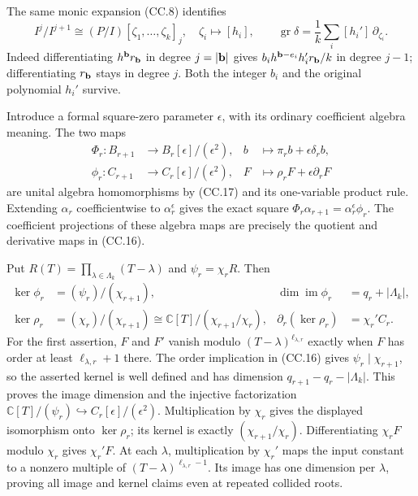 The same monic expansion (CC.8) identifies
\[
 I^j/I^{j+1}\cong
 (P/I)[\zeta_1,\ldots,\zeta_k]_j,\quad
 \zeta_i\longmapsto[h_i],
 \qquad
 \operatorname{gr}\delta
 =\frac1k\sum_i[h_i']\,\partial_{\zeta_i}.
 \tag{CC.18}
\]
Indeed differentiating \(h^{\bf b}r_{\bf b}\) in degree \(j=|{\bf b}|\)
gives \(b_i h^{{\bf b}-e_i}h_i'r_{\bf b}/k\) in degree \(j-1\);
differentiating \(r_{\bf b}\) stays in degree \(j\).
Both the integer \(b_i\) and the original polynomial \(h_i'\) survive.

Introduce a formal square-zero parameter \(\epsilon\), with its
ordinary coefficient algebra meaning.  The two maps
\[
\begin{split}
 \Phi_r:B_{r+1}&\longrightarrow B_r[\epsilon]/(\epsilon^2),
 &b&\longmapsto\pi_rb+\epsilon\delta_rb,\\
 \phi_r:C_{r+1}&\longrightarrow C_r[\epsilon]/(\epsilon^2),
 &F&\longmapsto\rho_rF+\epsilon\partial_rF
\end{split}
\tag{CC.19}
\]
are unital algebra homomorphisms by (CC.17) and its one-variable
product rule.  Extending \(\alpha_r\) coefficientwise to
\(\alpha_r^\epsilon\) gives the exact square
\(\Phi_r\alpha_{r+1}=\alpha_r^\epsilon\phi_r\).
The coefficient projections of these algebra maps are precisely
the quotient and derivative maps in (CC.16).

Put \(R(T)=\prod_{\lambda\in\Lambda_k}(T-\lambda)\) and
\(\psi_r=\chi_rR\).  Then
\[
\begin{split}
 \ker\phi_r&=(\psi_r)/(\chi_{r+1}),&
 \dim\operatorname{im}\phi_r&=q_r+|\Lambda_k|,\\
 \ker\rho_r&=(\chi_r)/(\chi_{r+1})
       \cong\mathbb C[T]/(\chi_{r+1}/\chi_r),&
 \partial_r(\ker\rho_r)&=\chi_r'C_r .
\end{split}
\tag{CC.20}
\]
For the first assertion, \(F\) and \(F'\) vanish modulo
\((T-\lambda)^{\ell_{\lambda,r}}\) exactly when \(F\) has order
at least \(\ell_{\lambda,r}+1\) there.  The order implication in
(CC.16) gives \(\psi_r\mid\chi_{r+1}\), so the asserted kernel is
well defined and has dimension \(q_{r+1}-q_r-|\Lambda_k|\).
This proves the image dimension and the injective factorization
\(\mathbb C[T]/(\psi_r)\hookrightarrow C_r[\epsilon]/(\epsilon^2)\).
Multiplication by \(\chi_r\) gives the displayed isomorphism onto
\(\ker\rho_r\); its kernel is exactly \((\chi_{r+1}/\chi_r)\).
Differentiating \(\chi_rF\) modulo \(\chi_r\) gives \(\chi_r'F\).
At each \(\lambda\), multiplication by \(\chi_r'\) maps the input
constant to a nonzero multiple of
\((T-\lambda)^{\ell_{\lambda,r}-1}\).
Its image has one dimension per \(\lambda\), proving all image
and kernel claims even at repeated collided roots.

